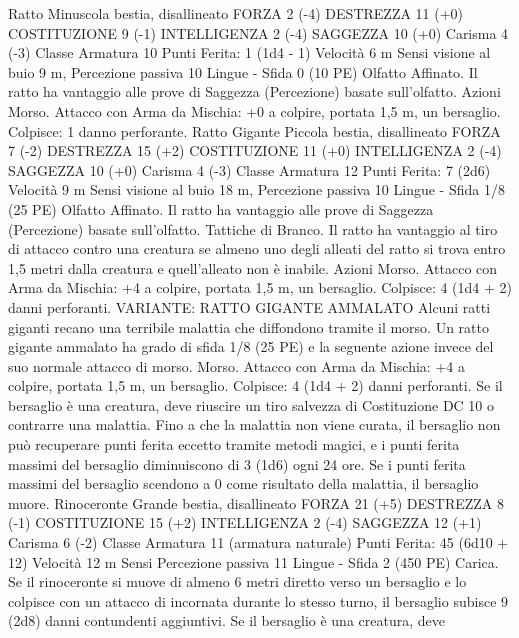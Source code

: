 \begin{multicols}{2}
Ratto
Minuscola bestia, disallineato
FORZA 2 (-4)
DESTREZZA 11 (+0)
COSTITUZIONE 9 (-1)
INTELLIGENZA 2 (-4)
SAGGEZZA 10 (+0)
Carisma 4 (-3)
Classe Armatura 10
\hspace*{0pt}\hfill{Punti Ferita}: 1 (1d4 - 1)
Velocità 6 m
Sensi visione al buio 9 m, Percezione passiva 10
Lingue -
Sfida 0 (10 PE)
Olfatto Affinato. Il ratto ha vantaggio alle prove di Saggezza
(Percezione) basate sull’olfatto.
Azioni
Morso. Attacco con Arma da Mischia: +0 a colpire, portata 1,5
m, un bersaglio.
Colpisce: 1 danno perforante.
Ratto Gigante
Piccola bestia, disallineato
FORZA 7 (-2)
DESTREZZA 15 (+2)
COSTITUZIONE 11 (+0)
INTELLIGENZA 2 (-4)
SAGGEZZA 10 (+0)
Carisma 4 (-3)
Classe Armatura 12
\hspace*{0pt}\hfill{Punti Ferita}: 7 (2d6)
Velocità 9 m
Sensi visione al buio 18 m, Percezione passiva 10
Lingue -
Sfida 1/8 (25 PE)
Olfatto Affinato. Il ratto ha vantaggio alle prove di Saggezza
(Percezione) basate sull’olfatto.
Tattiche di Branco. Il ratto ha vantaggio al tiro di attacco contro
una creatura se almeno uno degli alleati del ratto si trova entro
1,5 metri dalla creatura e quell’alleato non è inabile.
Azioni
Morso. Attacco con Arma da Mischia: +4 a colpire, portata 1,5
m, un bersaglio.
Colpisce: 4 (1d4 + 2) danni perforanti.
VARIANTE: RATTO GIGANTE AMMALATO
Alcuni ratti giganti recano una terribile malattia che diffondono
tramite il morso. Un ratto gigante ammalato ha grado di sfida 1/8
(25 PE) e la seguente azione invece del suo normale attacco di
morso.
Morso. Attacco con Arma da Mischia: +4 a colpire, portata 1,5
m, un bersaglio.
Colpisce: 4 (1d4 + 2) danni perforanti. Se il bersaglio è una
creatura, deve riuscire un tiro salvezza di Costituzione DC 10 o
contrarre una malattia. Fino a che la malattia non viene curata, il
bersaglio non può recuperare punti ferita eccetto tramite metodi
magici, e i punti ferita massimi del bersaglio diminuiscono di 3
(1d6) ogni 24 ore. Se i punti ferita massimi del bersaglio
scendono a 0 come risultato della malattia, il bersaglio muore.
Rinoceronte
Grande bestia, disallineato
FORZA 21 (+5)
DESTREZZA 8 (-1)
COSTITUZIONE 15 (+2)
INTELLIGENZA 2 (-4)
SAGGEZZA 12 (+1)
Carisma 6 (-2)
Classe Armatura 11 (armatura naturale)
\hspace*{0pt}\hfill{Punti Ferita}: 45 (6d10 + 12)
Velocità 12 m
Sensi Percezione passiva 11
Lingue -
Sfida 2 (450 PE)
Carica. Se il rinoceronte si muove di almeno 6 metri diretto
verso un bersaglio e lo colpisce con un attacco di incornata
durante lo stesso turno, il bersaglio subisce 9 (2d8) danni
contundenti aggiuntivi. Se il bersaglio è una creatura, deve

\end{multicols}
